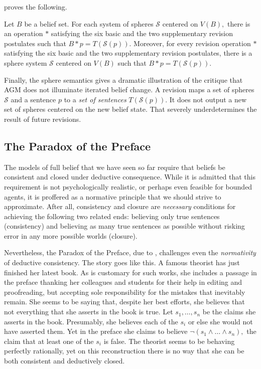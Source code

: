 \citet{grove1988two} proves the following.
\begin{theorem}
Let $B$ be a belief set. For each system of spheres $\mathcal{S}$ centered on
$V(B),$ there is an operation $*$ satisfying the six basic and the two
supplementary revision postulates such that $B*p = T(\mathcal{S}(p)).$ Moreover,
for every revision operation $*$ satisfying the six basic and the two
supplementary revision postulates, there is a sphere system $\mathcal{S}$
centered on $V(B)$ such that $B*p=T(\mathcal{S}(p)).$ 
\end{theorem}
Finally, the sphere semantics gives a dramatic illustration of the critique that
AGM does not illuminate iterated belief change. A revision maps a set of spheres
$\mathcal{S}$ and a sentence $p$ to a {\em set of sentences}
$T(\mathcal{S}(p)).$ It does not output a new set of spheres centered on the new
belief state. That severely underdetermines the result of future revisions.   

\subsection{The Paradox of the Preface}

The models of full belief that we have seen so far require that beliefs be
consistent and closed under deductive consequence. While it is admitted that
this requirement is not psychologically realistic, or perhaps even feasible for
bounded agents, it is proffered as a normative principle that we should strive
to approximate. After all, consistency and closure are {\em necessary}
conditions for achieving the following two related ends: believing only true
sentences (consistency) and believing as many true sentences as possible without
risking error in any more possible worlds (closure). 

Nevertheless, the Paradox of the Preface,  due to \citet{makinson1965preface},
challenges even the {\em normativity} of deductive consistency. The story goes
like this. A famous theorist has just finished her latest book. As is customary
for such works, she includes a passage in the preface thanking her colleagues
and students for their help in editing and proofreading, but accepting sole
responsibility for the mistakes that inevitably remain. She seems to be saying
that, despite her best efforts, she believes that not everything that she asserts
in the book is true. Let $s_1, \ldots, s_n$ be the claims she asserts in the
book. Presumably, she believes each of the $s_i$ or else she would not have
asserted them. Yet in the preface she claims to believe
$\neg(s_1\wedge\ldots\wedge s_n),$ the claim that at least one of the $s_i$ is
false. The theorist seems to be behaving perfectly rationally, yet on this
reconstruction there is no way that she can be both consistent and deductively
closed.

